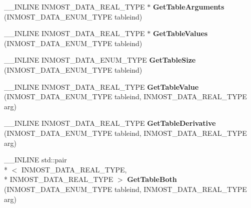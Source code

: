 \begin{DoxyCompactItemize}
\item 
\hypertarget{classINMOST_1_1Automatizator_a386334d1ee55031c7a6aa056ce1b0a51}{\-\_\-\-\_\-\-I\-N\-L\-I\-N\-E I\-N\-M\-O\-S\-T\-\_\-\-D\-A\-T\-A\-\_\-\-R\-E\-A\-L\-\_\-\-T\-Y\-P\-E $\ast$ {\bfseries Get\-Table\-Arguments} (I\-N\-M\-O\-S\-T\-\_\-\-D\-A\-T\-A\-\_\-\-E\-N\-U\-M\-\_\-\-T\-Y\-P\-E tableind)}\label{classINMOST_1_1Automatizator_a386334d1ee55031c7a6aa056ce1b0a51}

\item 
\hypertarget{classINMOST_1_1Automatizator_a510d6bc0f5c0f6a7b4b77e89c69581d8}{\-\_\-\-\_\-\-I\-N\-L\-I\-N\-E I\-N\-M\-O\-S\-T\-\_\-\-D\-A\-T\-A\-\_\-\-R\-E\-A\-L\-\_\-\-T\-Y\-P\-E $\ast$ {\bfseries Get\-Table\-Values} (I\-N\-M\-O\-S\-T\-\_\-\-D\-A\-T\-A\-\_\-\-E\-N\-U\-M\-\_\-\-T\-Y\-P\-E tableind)}\label{classINMOST_1_1Automatizator_a510d6bc0f5c0f6a7b4b77e89c69581d8}

\item 
\hypertarget{classINMOST_1_1Automatizator_a3ae68e40f3f6ca6eb1b19adfcecb29a2}{\-\_\-\-\_\-\-I\-N\-L\-I\-N\-E I\-N\-M\-O\-S\-T\-\_\-\-D\-A\-T\-A\-\_\-\-E\-N\-U\-M\-\_\-\-T\-Y\-P\-E {\bfseries Get\-Table\-Size} (I\-N\-M\-O\-S\-T\-\_\-\-D\-A\-T\-A\-\_\-\-E\-N\-U\-M\-\_\-\-T\-Y\-P\-E tableind)}\label{classINMOST_1_1Automatizator_a3ae68e40f3f6ca6eb1b19adfcecb29a2}

\item 
\hypertarget{classINMOST_1_1Automatizator_a1073064332cb980550e7f70c27651e12}{\-\_\-\-\_\-\-I\-N\-L\-I\-N\-E I\-N\-M\-O\-S\-T\-\_\-\-D\-A\-T\-A\-\_\-\-R\-E\-A\-L\-\_\-\-T\-Y\-P\-E {\bfseries Get\-Table\-Value} (I\-N\-M\-O\-S\-T\-\_\-\-D\-A\-T\-A\-\_\-\-E\-N\-U\-M\-\_\-\-T\-Y\-P\-E tableind, I\-N\-M\-O\-S\-T\-\_\-\-D\-A\-T\-A\-\_\-\-R\-E\-A\-L\-\_\-\-T\-Y\-P\-E arg)}\label{classINMOST_1_1Automatizator_a1073064332cb980550e7f70c27651e12}

\item 
\hypertarget{classINMOST_1_1Automatizator_ab53aea7d5721a212a790f84b610b1896}{\-\_\-\-\_\-\-I\-N\-L\-I\-N\-E I\-N\-M\-O\-S\-T\-\_\-\-D\-A\-T\-A\-\_\-\-R\-E\-A\-L\-\_\-\-T\-Y\-P\-E {\bfseries Get\-Table\-Derivative} (I\-N\-M\-O\-S\-T\-\_\-\-D\-A\-T\-A\-\_\-\-E\-N\-U\-M\-\_\-\-T\-Y\-P\-E tableind, I\-N\-M\-O\-S\-T\-\_\-\-D\-A\-T\-A\-\_\-\-R\-E\-A\-L\-\_\-\-T\-Y\-P\-E arg)}\label{classINMOST_1_1Automatizator_ab53aea7d5721a212a790f84b610b1896}

\item 
\hypertarget{classINMOST_1_1Automatizator_af3abf3ea1a304abff11cc3612b8cf3ba}{\-\_\-\-\_\-\-I\-N\-L\-I\-N\-E std\-::pair\\*
$<$ I\-N\-M\-O\-S\-T\-\_\-\-D\-A\-T\-A\-\_\-\-R\-E\-A\-L\-\_\-\-T\-Y\-P\-E, \\*
I\-N\-M\-O\-S\-T\-\_\-\-D\-A\-T\-A\-\_\-\-R\-E\-A\-L\-\_\-\-T\-Y\-P\-E $>$ {\bfseries Get\-Table\-Both} (I\-N\-M\-O\-S\-T\-\_\-\-D\-A\-T\-A\-\_\-\-E\-N\-U\-M\-\_\-\-T\-Y\-P\-E tableind, I\-N\-M\-O\-S\-T\-\_\-\-D\-A\-T\-A\-\_\-\-R\-E\-A\-L\-\_\-\-T\-Y\-P\-E arg)}\label{classINMOST_1_1Automatizator_af3abf3ea1a304abff11cc3612b8cf3ba}


\end{DoxyCompactItemize}
